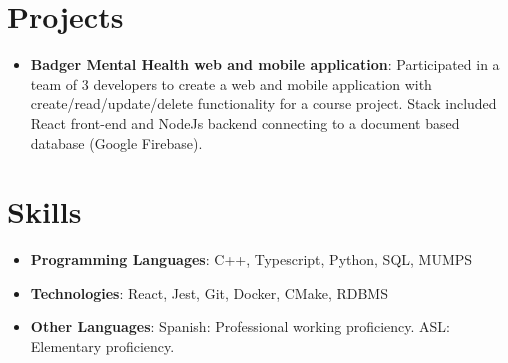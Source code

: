 \documentclass[letterpaper,11pt]{article}
\makeatletter
\newcommand{\resumeItem}[2]{
  \item\small{
    \textbf{#1}{: #2 \vspace{-2pt}}
  }
}
\newcommand{\resumeSubSubheading}[2]{
    \begin{tabular*}{0.97\textwidth}{l@{\extracolsep{\fill}}r}
      \textit{\small#1} & \textit{\small #2} \\
    \end{tabular*}\vspace{-5pt}
}
\newcommand{\resumeSubItem}[2]{\resumeItem{#1}{#2}\vspace{-4pt}}
\newcommand{\resumeSubHeadingListStart}{\begin{itemize}[leftmargin=*]}
\newcommand{\resumeSubHeadingListEnd}{\end{itemize}}
\newcommand{\resumeItemListStart}{\begin{itemize}}
\newcommand{\resumeItemListEnd}{\end{itemize}\vspace{-5pt}}
\makeatother
\begin{document}

\section{Projects}
  \resumeSubHeadingListStart
    \resumeSubItem{Badger Mental Health web and mobile application}
      {Participated in a team of 3 developers to create a web and mobile application with create/read/update/delete functionality for a course project. Stack included React front-end and NodeJs backend connecting to a document based database (Google Firebase).}
  \resumeSubHeadingListEnd

%

\section{Skills}
  \resumeItemListStart
    \resumeItem{Programming Languages}{C++, Typescript, Python, SQL, MUMPS}
    \resumeItem{Technologies}{React, Jest, Git, Docker, CMake, RDBMS}
    \resumeItem{Other Languages}{Spanish: Professional working proficiency. ASL: Elementary proficiency.}
  \resumeItemListEnd

\end{document}
